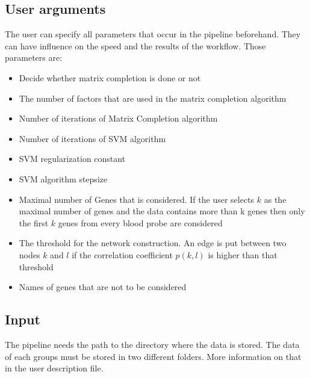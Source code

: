 \documentclass{bioinfo}
\begin{document}
 

\subsection{User arguments}
    The user can specify all parameters that occur in the pipeline beforehand. They can have influence on the speed and the results of the workflow. Those parameters are:
\begin{itemize}
\item Decide whether matrix completion is done or not
\item The number of factors that are used in the matrix completion algorithm
\item Number of iterations of Matrix Completion algorithm
\item Number of iterations of SVM algorithm
\item SVM regularization constant
\item SVM algorithm stepsize
\item Maximal number of Genes that is considered. If the user selects $k$ as the maximal number of genes and the data contains more than k genes then only the first $k$ genes from every blood probe are considered
\item The threshold for the network construction. An edge is put between two nodes $k$ and $l$ if the correlation coefficient $p(k,l)$ is higher than that threshold
\item Names of genes that are not to be considered
\end{itemize}

\subsection{Input}
The pipeline needs the path to the directory where the data is stored. The data of each groups must be stored in two different folders. More information on that in the user description file.
\end{document}
